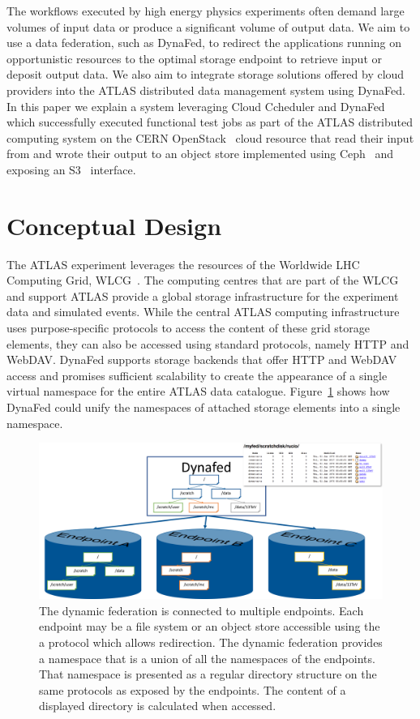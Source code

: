 \documentclass[a4paper]{jpconf}
\begin{document}
The workflows executed by high energy physics experiments often demand large volumes of input data or produce a significant volume of output data. We aim to use a data federation, such as DynaFed, to redirect the applications running on opportunistic resources to the optimal storage endpoint to retrieve input or deposit output data. We also aim to integrate storage solutions offered by cloud providers into the ATLAS distributed data management system using DynaFed.
In this paper we explain a system leveraging Cloud Ccheduler and DynaFed which successfully executed functional test jobs as part of the ATLAS distributed computing system on the CERN OpenStack~\cite{openstack} cloud resource that read their input from and wrote their output to an object store implemented using Ceph~\cite{ceph} and exposing an S3~\cite{s3} interface.

\section{Conceptual Design}
The ATLAS experiment leverages the resources of the Worldwide LHC Computing Grid, WLCG~\cite{wlcg}. The computing centres that are part of the WLCG and support ATLAS provide a global storage infrastructure for the experiment data and simulated events. While the central ATLAS computing infrastructure uses purpose-specific protocols to access the content of these grid storage elements, they can also be accessed using standard protocols, namely HTTP and WebDAV. DynaFed supports storage backends that offer HTTP and WebDAV access and promises sufficient scalability to create the appearance of a single virtual namespace for the entire ATLAS data catalogue.  Figure~\ref{fig:conceptual-design} shows how DynaFed could unify the namespaces of attached storage elements into a single namespace.

\begin{figure}
  \centering
  \includegraphics[width=\textwidth]{conceptual-design.png}
  \caption{The dynamic federation is connected to multiple endpoints. Each endpoint may be a file system or an object store accessible using the a protocol %
  which allows redirection. The dynamic federation provides a namespace that is a union of all the namespaces of the endpoints. That namespace is presented as a regular directory structure on %
  the same protocols as exposed by the endpoints. The content of a displayed directory is calculated when accessed.}
  \label{fig:conceptual-design}
\end{figure}
\end{document}
